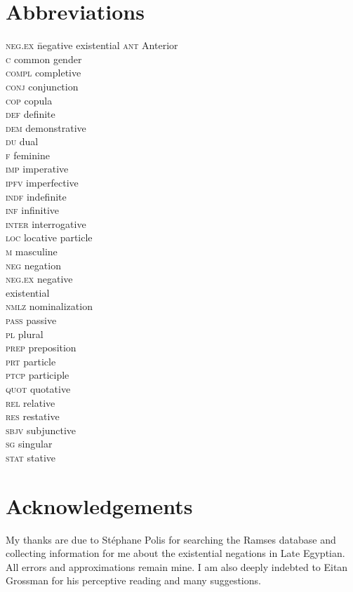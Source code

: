 \documentclass[output=paper,draft,draftmode,colorlinks,citecolor=brown]{langscibook}
\begin{document}
\section*{Abbreviations}
\begin{multicols}{3}
\begin{tabbing}
\textsc{neg.ex} \= negative existential\kill
\textsc{ant} \> Anterior\\
\textsc{c} \> common gender\\
\textsc{compl} \> completive\\
\textsc{conj} \> conjunction\\
\textsc{cop} \> copula\\
\textsc{def} \> definite\\
\textsc{dem} \> demonstrative\\
\textsc{du} \> dual\\
\textsc{f} \> feminine\\
\textsc{imp} \> imperative\\
\textsc{ipfv} \> imperfective\\
\textsc{indf} \> indefinite\\
\textsc{inf} \> infinitive\\
\textsc{inter} \> interrogative\\
\textsc{loc} \> locative particle\\
\textsc{m} \> masculine\\
\textsc{neg} \> negation\\
\textsc{neg.ex} \> negative \\ \> existential\\
\textsc{nmlz} \>	nominalization\\
\textsc{pass} \> passive\\
\textsc{pl} \> plural\\
\textsc{prep	} \> preposition\\
\textsc{prt} \> particle\\
\textsc{ptcp} \> participle\\
\textsc{quot} \> 	quotative\\
\textsc{rel} \> relative\\
\textsc{res} \> restative\\
\textsc{sbjv} \> subjunctive\\
\textsc{sg} \> singular\\
\textsc{stat} \> stative
\end{tabbing}
\end{multicols}

\section*{Acknowledgements}
My thanks are due to Stéphane Polis for searching the Ramses database and collecting information for me about the existential negations in Late Egyptian. All errors and approximations remain mine. I am also deeply indebted to Eitan Grossman for his perceptive reading and many suggestions. 
\end{document}
